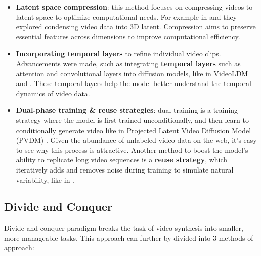 \begin{itemize}
    \item \textbf{Latent space compression}: this method focuses on compressing videos to latent space to optimize computational needs. For example in \cite{zeng2024make} and \cite{gu2023reuse} they explored condensing video data into 3D latent. Compression aims to preserve essential features across dimensions to improve computational efficiency.
    \item \textbf{Incorporating temporal layers} to refine individual video clips. Advancements were made, such as integrating \textbf{temporal layers} such as attention and convolutional layers into diffusion models, like in VideoLDM \cite{video_ldm} and \cite{gu2023reuse}. These temporal layers help the model better understand the temporal dynamics of video data.
    \item \textbf{Dual-phase training \& reuse strategies}: dual-training is a training strategy where the model is first trained unconditionally, and then learn to conditionally generate video like in Projected Latent Video Diffusion Model (PVDM) \cite{pvdm}. Given the abundance of unlabeled video data on the web, it's easy to see why this process is attractive. Another method to boost the model's ability to replicate long video sequences is a \textbf{reuse strategy}, which iteratively adds and removes noise during training to simulate natural variability, like in \cite{gu2023reuse}.
\end{itemize}








\subsection*{Divide and Conquer}

Divide and conquer paradigm breaks the task of video synthesis into smaller, more manageable tasks. This approach can further by divided into 3 methods of approach:

